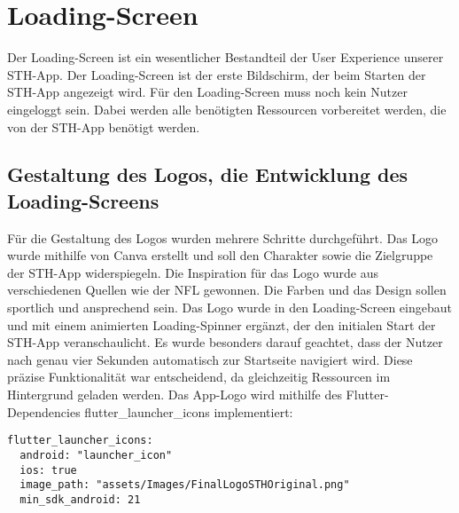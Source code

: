 \chapter{Loading-Screen}
Der Loading-Screen ist ein wesentlicher Bestandteil der User Experience unserer STH-App. Der Loading-Screen ist der erste Bildschirm, der beim Starten der STH-App angezeigt wird. Für den Loading-Screen muss noch kein Nutzer eingeloggt sein. Dabei werden alle benötigten Ressourcen vorbereitet werden, die von der STH-App benötigt werden.

\section{Gestaltung des Logos, die Entwicklung des Loading-Screens}
Für die Gestaltung des Logos wurden mehrere Schritte durchgeführt. Das Logo wurde mithilfe von Canva erstellt und soll den Charakter sowie die Zielgruppe der STH-App widerspiegeln.
Die Inspiration für das Logo wurde aus verschiedenen Quellen wie der NFL gewonnen. Die Farben und das Design sollen sportlich und ansprechend sein.
Das Logo wurde in den Loading-Screen eingebaut und mit einem animierten Loading-Spinner ergänzt, der den initialen Start der STH-App veranschaulicht. 
Es wurde besonders darauf geachtet, dass der Nutzer nach genau vier Sekunden automatisch zur Startseite navigiert wird. Diese präzise Funktionalität war entscheidend, da gleichzeitig Ressourcen im Hintergrund geladen werden.
Das App-Logo wird mithilfe des Flutter-Dependencies flutter\_launcher\_icons implementiert:
\begin{verbatim}
flutter_launcher_icons:
  android: "launcher_icon"
  ios: true
  image_path: "assets/Images/FinalLogoSTHOriginal.png"
  min_sdk_android: 21
\end{verbatim}
